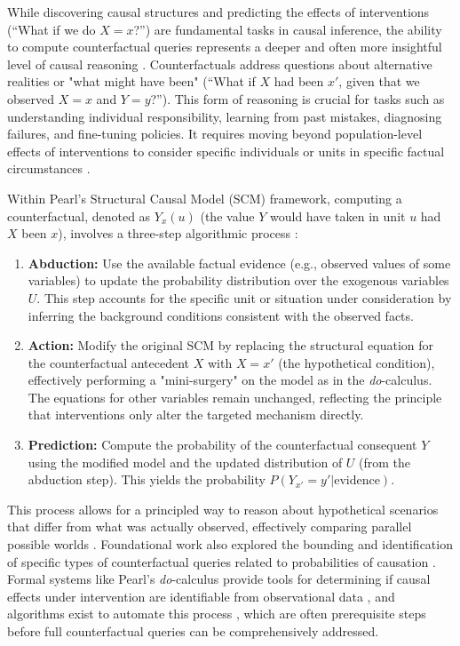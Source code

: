 {{While discovering causal structures and predicting the effects of interventions (``What if we do $X=x$?'') are fundamental tasks in causal inference, the ability to compute counterfactual queries represents a deeper and often more insightful level of causal reasoning \cite{Pearl2009Causality}. Counterfactuals address questions about alternative realities or "what might have been" (``What if $X$ had been $x'$, given that we observed $X=x$ and $Y=y$?''). This form of reasoning is crucial for tasks such as understanding individual responsibility, learning from past mistakes, diagnosing failures, and fine-tuning policies. It requires moving beyond population-level effects of interventions to consider specific individuals or units in specific factual circumstances \cite{Pearl2009Causality, Balke1994Probabilistic}.

Within Pearl's Structural Causal Model (SCM) framework, computing a counterfactual, denoted as $Y_x(u)$ (the value $Y$ would have taken in unit $u$ had $X$ been $x$), involves a three-step algorithmic process \cite{Pearl2009Causality}:
\begin{enumerate}
    \item \textbf{Abduction:} Use the available factual evidence (e.g., observed values of some variables) to update the probability distribution over the exogenous variables $U$. This step accounts for the specific unit or situation under consideration by inferring the background conditions consistent with the observed facts.
    \item \textbf{Action:} Modify the original SCM by replacing the structural equation for the counterfactual antecedent $X$ with $X=x'$ (the hypothetical condition), effectively performing a "mini-surgery" on the model as in the \textit{do}-calculus. The equations for other variables remain unchanged, reflecting the principle that interventions only alter the targeted mechanism directly.
    \item \textbf{Prediction:} Compute the probability of the counterfactual consequent $Y$ using the modified model and the updated distribution of $U$ (from the abduction step). This yields the probability $P(Y_{x'} = y' | \text{evidence})$.
\end{enumerate}

This process allows for a principled way to reason about hypothetical scenarios that differ from what was actually observed, effectively comparing parallel possible worlds \cite{Pearl2009Causality, Morgan2015Counterfactuals}. Foundational work also explored the bounding and identification of specific types of counterfactual queries related to probabilities of causation \cite{tian2000probabilities}. Formal systems like Pearl's \textit{do}-calculus provide tools for determining if causal effects under intervention are identifiable from observational data \cite{tian2002identification}, and algorithms exist to automate this process \cite{shpitser2012efficient}, which are often prerequisite steps before full counterfactual queries can be comprehensively addressed.

}}
